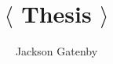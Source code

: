 



\title{$\langle$ Thesis $\rangle$}
\author{Jackson Gatenby}
\maketitle

\tableofcontents












